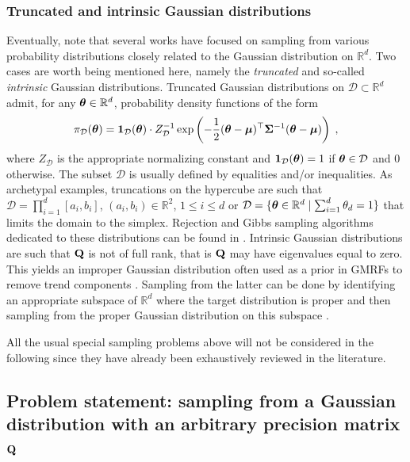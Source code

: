 \documentclass[nohypdvips,onefignum,onetabnum]{siamart171218}
\begin{document}
\subsubsection{Truncated and intrinsic Gaussian distributions}
Eventually, note that several works have focused on sampling from various probability distributions closely related to the Gaussian distribution on $\mathbb{R}^d$.
Two cases are worth being mentioned here, namely the \emph{truncated} and so-called \textit{intrinsic} Gaussian distributions.
Truncated Gaussian distributions on $\mathcal{D} \subset \mathbb{R}^d$ admit, for any $\boldsymbol{\theta} \in \mathbb{R}^d$, probability density functions of the form
\begin{equation}
    \pi_{\mathcal{D}}(\boldsymbol{\theta}) = \mathbf{1}_{\mathcal{D}}(\boldsymbol{\theta}) \cdot 
    Z_{\mathcal{D}}^{-1}
    \exp\left(-\dfrac{1}{2}(\boldsymbol{\theta}-\boldsymbol{\mu})^{\top}\mathbf{\Sigma}^{-1}(\boldsymbol{\theta}-\boldsymbol{\mu})\right)\;,
\end{equation}
where $Z_{\mathcal{D}}$ is the appropriate normalizing constant and $\mathbf{1}_{\mathcal{D}}(\boldsymbol{\theta}) = 1$ if $\boldsymbol{\theta} \in \mathcal{D}$ and $0$ otherwise.
The subset $\mathcal{D}$ is usually defined by equalities and/or inequalities.
As archetypal examples, truncations on the hypercube are such that $\mathcal{D} = \prod_{i=1}^d [a_i,b_i]$, $(a_i,b_i)\in \mathbb{R}^2$, $1\leq i\leq d$ or $\mathcal{D} = \{\boldsymbol{\theta} \in \mathbb{R}^d \mid \sum_{i=1}^d \theta_d=1\}$ that limits the domain to the simplex.
Rejection and Gibbs sampling algorithms dedicated to these distributions can be found in \cite{Altmann_IEEE_SSP_2014, Li2015,Wilhelm2010}.
Intrinsic Gaussian distributions are such that $\mathbf{Q}$ is not of full rank, that is $\mathbf{Q}$ may have eigenvalues equal to zero.
This yields an improper Gaussian distribution often used as a prior in GMRFs to remove trend components \cite{Rue2005}.
Sampling from the latter can be done by identifying an appropriate subspace of $\mathbb{R}^d$ where the target distribution is proper and then sampling from the proper Gaussian distribution on this subspace \cite{Besag1995, Parker2012}.

All the usual special sampling problems above will not be considered in the following since they have already been exhaustively reviewed in the literature.

\subsection{Problem statement: sampling from a Gaussian distribution with an arbitrary precision  matrix $\mathbf{Q}$}\label{subsec:problem}
\end{document}
